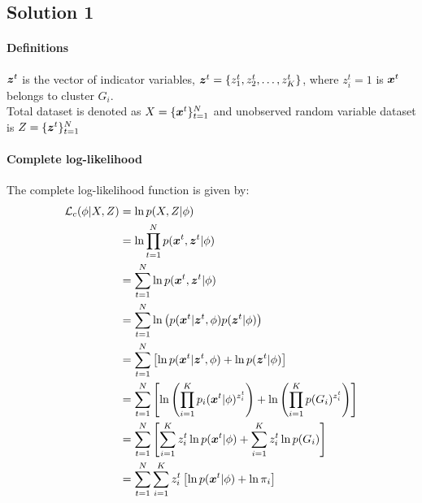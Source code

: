 \subsection*{Solution 1}
\paragraph{Definitions}
$\boldsymbol{z}^t$ is the vector of indicator variables, $\boldsymbol{z}^t=\{z^t_1, z^t_2,\ldots,z^t_K\}$, where $z^t_i =1$ is $\boldsymbol{x}^t$ belongs to cluster $G_i$.\\
Total dataset is denoted as $X = \{\boldsymbol{x}^t\}^{N}_{t=1}$ and unobserved random variable dataset is $Z = \{\boldsymbol{z}^t\}^{N}_{t=1}$
\paragraph{Complete log-likelihood} The complete log-likelihood function is given by:
\begin{equation}
	\begin{split}
		\mathcal{L}_c(\phi | X, Z) &= \ln p(X, Z | \phi)\\
		&= \ln \prod_{t=1}^N p(\boldsymbol{x}^t, \boldsymbol{z}^t | \phi)\\
		&= \sum_{t=1}^{N} \ln p(\boldsymbol{x}^t, \boldsymbol{z}^t | \phi)\\
		&= \sum_{t=1}^{N} \ln \left(p(\boldsymbol{x}^t|\boldsymbol{z}^t, \phi)p(\boldsymbol{z}^t|\phi)\right)\\
		&= \sum_{t=1}^{N} \left[\ln p(\boldsymbol{x}^t|\boldsymbol{z}^t, \phi) + \ln p(\boldsymbol{z}^t|\phi)\right]\\
		&= \sum_{t=1}^{N} \left[\ln \left(\prod_{i=1}^{K} p_i(\boldsymbol{x}^t|\phi)^{z^t_i}\right) + \ln \left(\prod_{i=1}^{K}p(G_i)^{z^t_i}\right)\right]\\
		&= \sum_{t=1}^{N} \left[\sum_{i=1}^{K} z^t_i \ln p(\boldsymbol{x}^t|\phi) + \sum_{i=1}^{K} z^t_i \ln p(G_i)\right]\\
		&= \sum_{t=1}^{N} \sum_{i=1}^{K} z^t_i \left[\ln p(\boldsymbol{x}^t|\phi) + \ln \pi_i\right]
	\end{split}
\end{equation}
